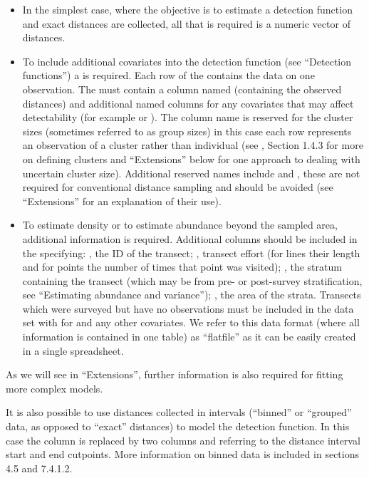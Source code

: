 \documentclass[article,shortnames]{jss}
\providecommand{\tightlist}{%
  \setlength{\itemsep}{0pt}\setlength{\parskip}{0pt}}
\begin{document}
\begin{itemize}
\tightlist
\item
  In the simplest case, where the objective is to estimate a detection
  function and exact distances are collected, all that is required is a
  numeric vector of distances.
\item
  To include additional covariates into the detection function (see
  ``Detection functions'') a  is required. Each row of
  the  contains the data on one observation. The
   must contain a column named 
  (containing the observed distances) and additional named columns for
  any covariates that may affect detectability (for example
   or ). The column name  is
  reserved for the cluster sizes (sometimes referred to as group sizes)
  in this case each row represents an observation of a cluster rather
  than individual (see \citet{Buckland:2001vm}, Section 1.4.3 for more
  on defining clusters and ``Extensions'' below for one approach to
  dealing with uncertain cluster size). Additional reserved names
  include  and , these are not required for
  conventional distance sampling and should be avoided (see
  ``Extensions'' for an explanation of their use).
\item
  To estimate density or to estimate abundance beyond the sampled area,
  additional information is required. Additional columns should be
  included in the  specifying: , the
  ID of the transect; , transect effort (for lines their
  length and for points the number of times that point was visited);
  , the stratum containing the transect (which may be
  from pre- or post-survey stratification, see ``Estimating abundance
  and variance''); , the area of the strata. Transects which
  were surveyed but have no observations must be included in the data
  set with  for  and any other covariates. We
  refer to this data format (where all information is contained in one
  table) as ``flatfile'' as it can be easily created in a single
  spreadsheet.
\end{itemize}

As we will see in ``Extensions'', further information is also required
for fitting more complex models.

It is also possible to use distances collected in intervals (``binned''
or ``grouped'' data, as opposed to ``exact'' distances) to model the
detection function. In this case the column  is replaced
by two columns  and  referring to the
distance interval start and end cutpoints. More information on binned
data is included in \citet{Buckland:2001vm} sections 4.5 and 7.4.1.2.
\end{document}
